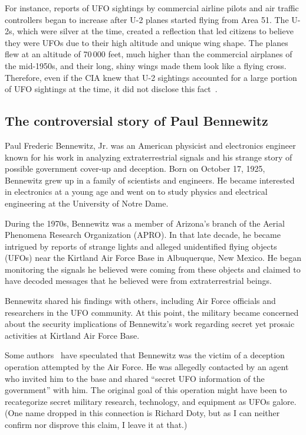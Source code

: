 For instance, reports of UFO sightings by commercial airline pilots and air traffic controllers began to increase after
U-2 planes started flying from Area 51.
The U-2s, which were silver at the time, created a reflection that led citizens to believe they were UFOs due to their high altitude
and unique wing shape. The planes flew at an altitude of 70\,000 feet, much higher than the commercial airplanes of the mid-1950s,
and their long, shiny wings made them look like a flying cross. Therefore, even if the CIA knew that U-2 sightings accounted for
a large portion of UFO sightings at the time, it did not disclose this fact~\cite[Chapter~4]{Jacobsen2011}.

\subsection{The controversial story of Paul Bennewitz}

Paul Frederic Bennewitz, Jr. was an American physicist and electronics engineer
known for his work in analyzing extraterrestrial signals and his strange story of possible government cover-up and deception.
Born on October 17, 1925, Bennewitz grew up in a family of scientists and engineers. He became interested in electronics at a young age and went on to study physics and electrical engineering at the University of Notre Dame.

During the 1970s, Bennewitz was a member of Arizona's branch of the Aerial Phenomena Research Organization (APRO).
In that late decade, he became
intrigued by reports of strange lights and alleged unidentified flying objects (UFOs) near the Kirtland Air Force Base in Albuquerque, New Mexico. He began monitoring the signals he believed were coming from these objects and claimed to have decoded messages that he believed were from extraterrestrial beings.

Bennewitz shared his findings with others, including Air Force officials and researchers in the UFO community. At this point, the military became concerned about the security implications of Bennewitz's work regarding secret yet prosaic activities at Kirtland Air Force Base.

Some authors~\cite{Pilkington2010Sep,Pilkington2013} have speculated that Bennewitz was the victim of a deception operation attempted by the Air Force.
He was allegedly contacted by an agent who invited him to the base and shared ``secret UFO information of the government'' with him. The original goal of this operation might have been to recategorize secret military research, technology, and equipment as UFOs galore.
(One name dropped in this connection is Richard Doty, but as I can neither confirm nor disprove this claim, I leave it at that.)

